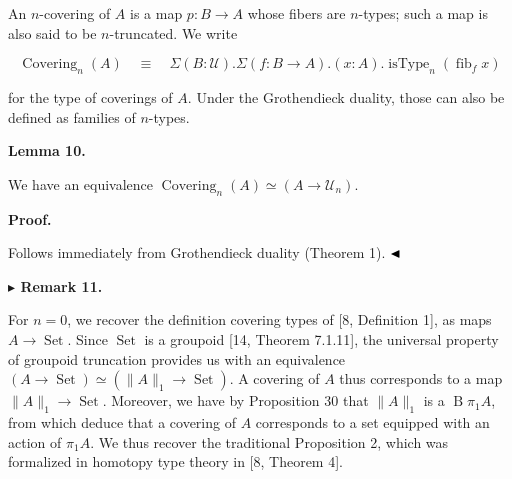 \documentclass[10pt,a4paper]{article}
\begin{document}
 
 
An $n$-covering of $A$ is a map $p:B\to A$ whose fibers are $n$-types; such a map is also said to be $n$-truncated. We write\par
  
\par  \quad  \[\operatorname{Covering}_{n}(A)\quad\equiv\quad\Sigma(B:\mathcal{U}).\Sigma(f:B\to A).(x:A).\operatorname{isType}_{n}(\operatorname{fib}_{f}x)\]\quad  \quad  
  
for the type of coverings of $A$. Under the Grothendieck duality, those can also be defined as families of $n$-types.\par
 
 
 
\par\medskip\noindent\textbf{Lemma 10.}\par
 
 
We have an equivalence $\operatorname{Covering}_{n}(A)\simeq(A\to\mathcal{U}_{n})$.\par
 
 
 
 
\par\medskip\noindent\textbf{Proof.}\par
 
 
Follows immediately from Grothendieck duality (Theorem 1). $\hfill\blacktriangleleft$\par
 
 
 
\par\medskip\noindent\textbf{$\blacktriangleright$ Remark 11.}\par
 
 
For $n=0$, we recover the definition covering types of [8, Definition 1], as maps $A\to\operatorname{Set}$. Since $\operatorname{Set}$ is a groupoid [14, Theorem 7.1.11], the universal property of groupoid truncation provides us with an equivalence $(A\to\operatorname{Set})\simeq(\|A\|_{1}\to\operatorname{Set})$. A covering of $A$ thus corresponds to a map $\|A\|_{1}\to\operatorname{Set}$. Moreover, we have by Proposition 30 that $\|A\|_{1}$ is a $\operatorname{B}\pi_{1}A$, from which deduce that a covering of $A$ corresponds to a set equipped with an action of $\pi_{1}A$. We thus recover the traditional Proposition 2, which was formalized in homotopy type theory in [8, Theorem 4].\par
 
\end{document}

